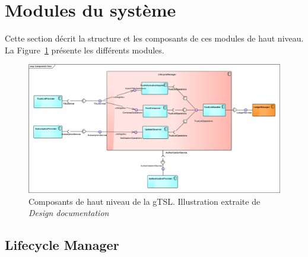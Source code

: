\documentclass{tnreport}
\begin{document}
\section{Modules du système}
\label{sec:modules}


Cette section décrit la structure et les composants de ces modules de haut niveau. La Figure~\ref{fig:highlevel-components} présente les différents modules.

\begin{figure}[h]
	\centering
	\includegraphics[scale=0.38]{figures/highlevel-components}
	\caption{Composants de haut niveau de la gTSL. Illustration extraite de \textit{Design documentation}~\cite{design-document}}
	\label{fig:highlevel-components}
\end{figure}

\subsection{Lifecycle Manager}
\end{document}
